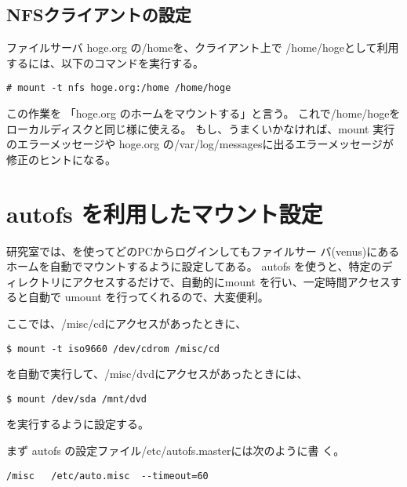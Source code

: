 \documentclass{jreport}
\begin{document}
\subsection{NFSクライアントの設定}

ファイルサーバ hoge.org の{\ttfamily /home}を、クライアント上で
{\ttfamily /home/hoge}として利用するには、以下のコマンドを実行する。
\begin{screen}
\begin{verbatim}
# mount -t nfs hoge.org:/home /home/hoge
\end{verbatim}
\end{screen}

この作業を 「hoge.org のホームをマウントする」と言う。
これで{\ttfamily /home/hoge}をローカルディスクと同じ様に使える。
もし、うまくいかなければ、mount 実行のエラーメッセージや
hoge.org の{\ttfamily /var/log/messages}に出るエラーメッセージが
修正のヒントになる。



\section{autofs を利用したマウント設定\label{sec:autofs}}


研究室では、を使ってどのPCからログインしてもファイルサー
バ(venus)にあるホームを自動でマウントするように設定してある。
autofs を使うと、特定のディレクトリにアクセスするだけで、自動的にmount
を行い、一定時間アクセスすると自動で umount を行ってくれるので、大変便利。

ここでは、{\ttfamily /misc/cd}にアクセスがあったときに、
\begin{screen}
\begin{verbatim}
$ mount -t iso9660 /dev/cdrom /misc/cd
\end{verbatim}
\end{screen}

を自動で実行して、{\ttfamily /misc/dvd}にアクセスがあったときには、
\begin{screen}
\begin{verbatim}
$ mount /dev/sda /mnt/dvd
\end{verbatim}
\end{screen}

を実行するように設定する。

まず autofs の設定ファイル{\ttfamily /etc/autofs.master}には次のように書
く。
\begin{screen}
\begin{verbatim}
/misc   /etc/auto.misc  --timeout=60
\end{verbatim}
\end{screen}
\end{document}
